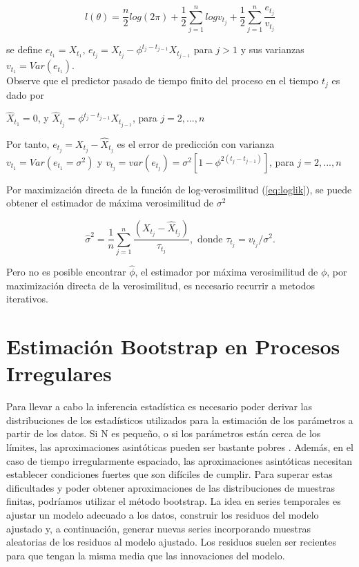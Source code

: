 \begin{equation}
	l(\theta) = \frac{n}{2}log(2\pi) + \frac{1}{2}\sum_{j=1}^{n} log v_{t_j} +  \frac{1}{2}\sum_{j=1}^{n}\frac{e_{t_j}}{v_{t_j}}
	\label{eq:loglik}
\end{equation}

se define $e_{t_1} = X_{t_1}$, $e_{t_j} = X_{t_j}-\phi^{t_j-t_{j-1}}X_{t_{j-1}}$ para $j>1$ y sus varianzas $v_{t_1} = Var(e_{t_1}) $.\\

Observe que el predictor pasado de tiempo finito del proceso en el tiempo $t_j$ es dado por 

$\hat{X}_{t_1} = 0$, y $\hat{X}_{t_j} = \phi^{t_j - t_{j-1}} X_{t_{j-1}}$, para $j = 2, ... , n$ 

Por tanto, $e_{t_j} = X_{t_j} - \hat{X}_{t_j}$ es el error de predicción con varianza $v_{t_1} = Var(e_{t_1} = \sigma^2)$ y
$v_{t_j} = var(e_{t_j}) = \sigma^2[1 - \phi^{2(t_j - t_{j-1})}]$, para $j = 2, ... , n$ 

Por maximización directa de la función de log-verosimilitud (\ref{eq:loglik}), se puede obtener el estimador de máxima verosimilitud de $\sigma^2$

\begin{equation}
	\hat{\sigma}^2 = \frac{1}{n} \sum_{j=1}^{n} \frac{\left(X_{t_j} - \hat{X}_{t_j}\right)}{\tau_{t_j}}, \text{ donde } \tau_{t_j} = v_{t_j}/\sigma^2.
\end{equation}

Pero no es posible encontrar $\hat{\phi}$, el estimador por máxima verosimilitud de $\phi$, por maximización directa de la verosimilitud, es necesario
recurrir a metodos iterativos. 


\section{Estimación Bootstrap en Procesos Irregulares} \label{section:Bootstrap}

Para llevar a cabo la inferencia estadística es necesario poder derivar las distribuciones de los estadísticos
utilizados para la estimación de los parámetros a partir de los datos. Si $\mathrm{N}$ es pequeño,
o si los parámetros están cerca de los límites, las aproximaciones asintóticas pueden ser bastante pobres \citep{shumway2017time}.
Además, en el caso de tiempo irregularmente espaciado, las aproximaciones asintóticas necesitan establecer condiciones fuertes
que son difíciles de cumplir. Para superar estas dificultades y poder obtener aproximaciones de las distribuciones 
de muestras finitas, podríamos utilizar el método bootstrap. La idea en series temporales es ajustar un modelo adecuado a los datos,
construir los residuos del modelo ajustado y, a continuación, generar nuevas series incorporando muestras aleatorias de los residuos
al modelo ajustado. Los residuos suelen ser recientes para que tengan la misma media que las innovaciones del modelo.


